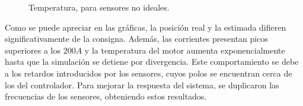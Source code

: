 \documentclass[a4paper, 10pt, onecolumn,journal]{ieeeconf}
\begin{document}
\begin{figure}[H]
	\centering
	\begin{adjustbox}{scale=0.5,max width=\columnwidth}
	\end{adjustbox}
	\caption{Temperatura, para sensores no ideales.}
	\label{Temperatura, para sensores no ideales}
\end{figure}

Como se puede apreciar en las gráficas, la posición real y la estimada difieren significativamente de la consigna. Además, las corrientes presentan picos superiores a los $200 A$ y la temperatura del motor aumenta exponencialmente hasta que la simulación se detiene por divergencia. Este comportamiento se debe a los retardos introducidos por los sensores, cuyos polos se encuentran cerca de los del controlador. Para mejorar la respuesta del sistema, se duplicaron las frecuencias de los sensores, obteniendo estos resultados.
\end{document}
